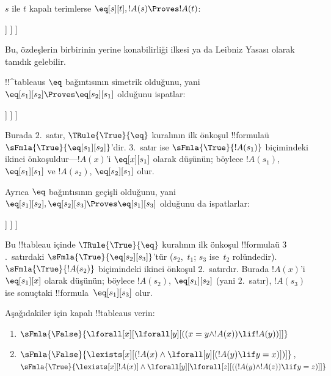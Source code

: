 \begin{ex}
$s$ ile $t$ kapalı terimlerse $\eq[s][t], !A(s) \Proves !A(t)$:
\begin{oltableau}
  [\sFmla{\False}{\formula{A}(t)}, just = \TAss
    [\sFmla{\True}{\eq[s][t]}, just = \TAss
      [\sFmla{\True}{\formula{A}(s)}, just = \TAss
        [\sFmla{\True}{\formula{A}(t)}, just={\TRule{\True}{\eq}[2, 3]}, close]
      ]
    ]
  ]
\end{oltableau}
Bu, özdeşlerin birbirinin yerine konabilirliği ilkesi ya da Leibniz Yasası
olarak tanıdık gelebilir.

!!^{tableau}s $\eq$ bağıntısının simetrik olduğunu, yani
$\eq[s_1][s_2] \Proves \eq[s_2][s_1]$ olduğunu ispatlar:
\begin{oltableau}
  [\sFmla{\False}{\eq[s_2][s_1]}, just = \TAss
    [\sFmla{\True}{\eq[s_1][s_2]}, just = \TAss
      [\sFmla{\True}{\eq[s_1][s_1]}, just = {$\eq$}
        [\sFmla{\True}{\eq[s_2][s_1]}, just = {\TRule{\True}{\eq}[2, 3]}, close]
      ]
    ]
  ]
\end{oltableau}
Burada $2$.~satır, $\TRule{\True}{\eq}$ kuralının ilk önkoşul
!!{formula}{}ü~$\sFmla{\True}{\eq[s_1][s_2]}$'dir. $3$.~satır ise
$\sFmla{\True}{!A(s_1)}$ biçimindeki ikinci önkoşuldur---$!A(x)$'i
$\eq[x][s_1]$ olarak düşünün; böylece $!A(s_1)$, $\eq[s_1][s_1]$ ve
$!A(s_2)$, $\eq[s_2][s_1]$ olur.

Ayrıca $\eq$ bağıntısının geçişli olduğunu, yani $\eq[s_1][s_2],
\eq[s_2][s_3] \Proves \eq[s_1][s_3]$ olduğunu da ispatlarlar:
\begin{oltableau}
  [\sFmla{\False}{\eq[s_1][s_3]}, just = \TAss
    [\sFmla{\True}{\eq[s_1][s_2]}, just = \TAss
      [\sFmla{\True}{\eq[s_2][s_3]}, just = \TAss
        [\sFmla{\True}{\eq[s_1][s_3]}, just = {\TRule{\True}{\eq}[3, 2]}, close]
      ]
    ]
  ]
\end{oltableau}
Bu !!{tableau} içinde $\TRule{\True}{\eq}$ kuralının ilk önkoşul
!!{formula}{}ü $3$.~satırdaki $\sFmla{\True}{\eq[s_2][s_3]}$'tür
($s_2$,~$t_1$; $s_3$ ise~$t_2$ rolündedir). $\sFmla{\True}{!A(s_2)}$
biçimindeki ikinci önkoşul $2$.~satırdır. Burada $!A(x)$'i
$\eq[s_1][x]$ olarak düşünün; böylece $!A(s_2)$, $\eq[s_1][s_2]$ (yani
$2$.~satır), $!A(s_3)$ ise sonuçtaki !!{formula}~$\eq[s_1][s_3]$ olur.
\end{ex}

\begin{prob}
Aşağıdakiler için kapalı !!{tableau}s verin:
\begin{enumerate}
\item $\sFmla{\False}{\lforall[x][\lforall[y][((x = y \land !A(x))
      \lif !A(y))]]}$
\item $\sFmla{\False}{\lexists[x][(!A(x) \land
    \lforall[y][(!A(y) \lif y = x)])]}$,\\
  $\sFmla{\True}{\lexists[x][!A(x)] \land
    \lforall[y][\lforall[z][((!A(y) \land !A(z)) \lif y = z)]]}$
\end{enumerate}
\end{prob}

